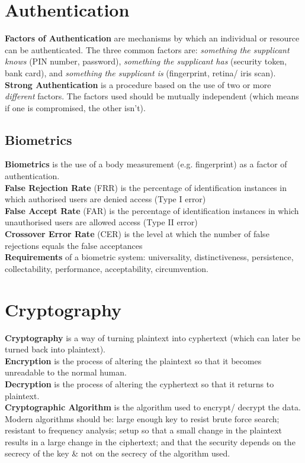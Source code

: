\documentclass[a4paper,11pt]{article}
\begin{document}
\section{Authentication}
\textbf{Factors of Authentication} are mechanisms by which an individual or resource can be authenticated. The three common factors are: \textit{something the supplicant knows} (PIN number, password), \textit{something the supplicant has} (security token, bank card), and \textit{something the supplicant is} (fingerprint, retina/ iris scan).\\
\textbf{Strong Authentication} is a procedure based on the use of two or more \textit{different} factors. The factors used should be mutually independent (which means if one is compromised, the other isn't).\\
\subsection{Biometrics}
\textbf{Biometrics} is the use of a body measurement (e.g. fingerprint) as a factor of authentication.\\
\textbf{False Rejection Rate} (FRR) is the percentage of identification instances in which authorised users are denied access (Type I error)\\
\textbf{False Accept Rate} (FAR) is the percentage of identification instances in which unauthorised users are allowed access (Type II error)\\
\textbf{Crossover Error Rate} (CER) is the level at which the number of false rejections equals the false acceptances\\
\textbf{Requirements} of a biometric system: universality, distinctiveness, persistence, collectability, performance, acceptability, circumvention.

\section{Cryptography}
\textbf{Cryptography} is a way of turning plaintext into cyphertext (which can later be turned back into plaintext).\\
\textbf{Encryption} is the process of altering the plaintext so that it becomes unreadable to the normal human.\\
\textbf{Decryption} is the process of altering the cyphertext so that it returns to plaintext.\\
\textbf{Cryptographic Algorithm} is the algorithm used to encrypt/ decrypt the data. Modern algorithms should be: large enough key to resist brute force search; resistant to frequency analysis; setup so that a small change in the plaintext results in a large change in the ciphertext; and that the security depends on  the secrecy of the key \& not on the secrecy of the algorithm used.
\end{document}
